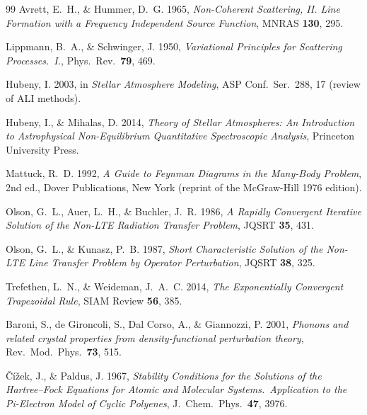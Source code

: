 \documentclass[11pt]{article}
\begin{document}
\begin{thebibliography}{99}
Avrett, E.~H., \& Hummer, D.~G. 1965, \emph{Non-Coherent Scattering, II.
Line Formation with a Frequency Independent Source Function},
MNRAS \textbf{130}, 295.

Lippmann, B.~A., \& Schwinger, J. 1950, \emph{Variational Principles
for Scattering Processes.~I.}, Phys.~Rev.\ \textbf{79}, 469.

Hubeny, I. 2003, in \emph{Stellar Atmosphere Modeling}, ASP Conf.~Ser.~288,
17 (review of ALI methods).

Hubeny, I., \& Mihalas, D. 2014, \emph{Theory of Stellar Atmospheres: An
Introduction to Astrophysical Non-Equilibrium Quantitative Spectroscopic
Analysis}, Princeton University Press.

Mattuck, R.~D. 1992, \emph{A Guide to Feynman Diagrams in the
Many-Body Problem}, 2nd ed., Dover Publications, New York
(reprint of the McGraw-Hill 1976 edition).

Olson, G.~L., Auer, L.~H., \& Buchler, J.~R. 1986, \emph{A Rapidly
Convergent Iterative Solution of the Non-LTE Radiation Transfer Problem},
JQSRT \textbf{35}, 431.

Olson, G.~L., \& Kunasz, P.~B. 1987, \emph{Short Characteristic Solution
of the Non-LTE Line Transfer Problem by Operator Perturbation},
JQSRT \textbf{38}, 325.

Trefethen, L.~N., \& Weideman, J.~A.~C. 2014, \emph{The Exponentially
Convergent Trapezoidal Rule}, SIAM Review \textbf{56}, 385.


Baroni, S., de Gironcoli, S., Dal Corso, A., \& Giannozzi, P. 2001,
\emph{Phonons and related crystal properties from density-functional
perturbation theory}, Rev.\ Mod.\ Phys.\ \textbf{73}, 515.

\v{C}\'i\v{z}ek, J., \& Paldus, J. 1967, \emph{Stability Conditions
for the Solutions of the Hartree--Fock Equations for Atomic and
Molecular Systems.\ Application to the Pi-Electron Model of Cyclic
Polyenes}, J.\ Chem.\ Phys.\ \textbf{47}, 3976.


\end{thebibliography}
\end{document}
